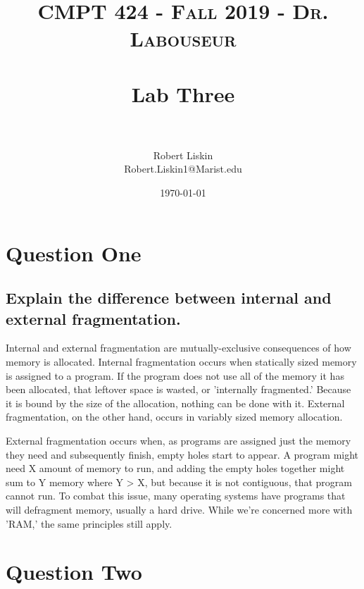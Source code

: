 \documentclass[letterpaper, 10pt,DIV=13]{scrartcl}
\title{	
   \normalfont \normalsize 
   \textsc{CMPT 424 - Fall 2019 - Dr. Labouseur} \\[10pt] %
   \horrule{0.5pt} \\[0.25cm] 	%
   \huge Lab Three  \\     	    %
   \horrule{0.5pt} \\[0.25cm] 	%
}
\author{Robert Liskin \\ \normalsize Robert.Liskin1@Marist.edu}
\date{\normalsize\today} 	%
\numberwithin{equation}{section} %
\numberwithin{figure}{section} %
\numberwithin{table}{section} %
\begin{document}
\maketitle %

\section{Question One}

\subsection{Explain the difference between internal and external fragmentation.}

Internal and external fragmentation are mutually-exclusive consequences of how memory is allocated. Internal fragmentation occurs when statically sized memory is assigned to a program. If the program does not use all of the memory it has been allocated, that leftover space is wasted, or 'internally fragmented.' Because it is bound by the size of the allocation, nothing can be done with it. External fragmentation, on the other hand, occurs in variably sized memory allocation.
\par
External fragmentation occurs when, as programs are assigned just the memory they need and subsequently finish, empty holes start to appear. A program might need X amount of memory to run, and adding the empty holes together might sum to Y memory where Y > X, but because it is not contiguous, that program cannot run. To combat this issue, many operating systems have programs that will defragment memory, usually a hard drive. While we're concerned more with 'RAM,' the same principles still apply.


\pagebreak
\section{Question Two}
\end{document}
